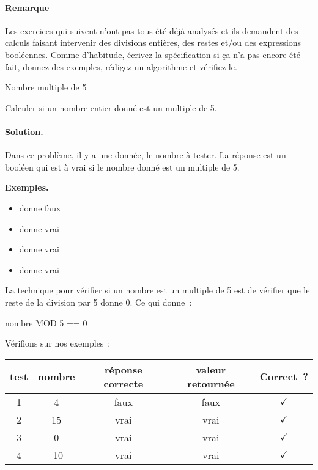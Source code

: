 \bigskip
\begin{Emphase}
	
	\paragraph{Remarque}
	Les exercices qui suivent n’ont pas tous été déjà analysés et ils demandent
	des calculs faisant intervenir des divisions entières, des restes et/ou des
	expressions booléennes.  Comme d’habitude, écrivez la spécification si ça
	n’a pas encore été fait, donnez des exemples, rédigez un algorithme et
	vérifiez-le.

\end{Emphase}

		\begin{Exercice}{Nombre multiple de 5}

			\label{algo:mult5}
			Calculer si un nombre entier donné est un multiple de 5.
			\paragraph{Solution.}
			Dans ce problème,
			il y a une donnée, le nombre à tester.
			La réponse est un booléen
			qui est à vrai si le nombre donné est un multiple de 5.
			\begin{center}
			\end{center}
			\textbf{Exemples.}
			\begin{multicols}{4}
				\begin{itemize}
					\item {} donne faux
					\item {} donne vrai
					\item {} donne vrai
					\item {} donne vrai
				\end{itemize}
			\end{multicols}
			La technique pour vérifier si un nombre est
			un multiple de 5 est de vérifier que le reste
			de la division par 5 donne 0.
			Ce qui donne~:
			\begin{pseudocode}[1]
				\Return nombre MOD 5 == 0
			\EndAlgo
		\end{pseudocode}
		Vérifions sur nos exemples~:
		\begin{center}
			\begin{tabular}{|c|c|c|c|c|}
				\hline
				test \no & nombre & réponse correcte & valeur retournée & Correct~? \\\hline
				\hline 
				1 & 4   & faux & faux & {\color{ForestGreen}$\checkmark$} \\\hline
				2 & 15  & vrai & vrai & {\color{ForestGreen}$\checkmark$} \\\hline
				3 & 0   & vrai & vrai & {\color{ForestGreen}$\checkmark$} \\\hline
				4 & -10 & vrai & vrai & {\color{ForestGreen}$\checkmark$} \\\hline
			\end{tabular}
		\end{center}
	\end{Exercice}

